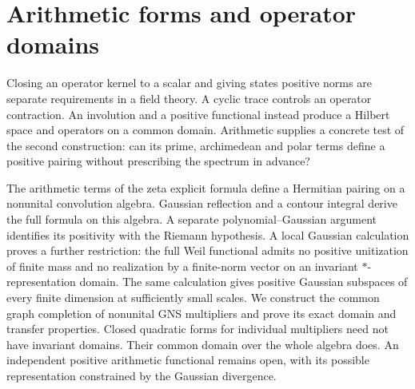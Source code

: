 \chapter{Arithmetic forms and operator domains}
\label{chap:weil-operator-domains}
\begingroup
{}
\newcommand{\A}{\mathcal A}

Closing an operator kernel to a scalar and giving states positive norms
are separate requirements in a field theory.
A cyclic trace controls an operator contraction.  An involution and a
positive functional instead produce a Hilbert space and operators on a
common domain.  Arithmetic supplies a concrete test of the second
construction: can its prime, archimedean and polar terms define a positive
pairing without prescribing the spectrum in advance?

The arithmetic terms of the zeta explicit formula define a Hermitian
pairing on a nonunital convolution algebra.  Gaussian reflection and a
contour integral derive the full formula on this algebra.  A separate
polynomial--Gaussian argument identifies its positivity with the Riemann
hypothesis.  A local Gaussian calculation proves a further
restriction: the full Weil functional admits no positive unitization of
finite mass and no realization by a finite-norm vector on an invariant
$*$-representation domain.  The same calculation gives positive Gaussian
subspaces of every finite dimension at sufficiently small scales.
We construct the common graph completion of
nonunital GNS multipliers and prove its exact domain and transfer
properties.  Closed quadratic forms for individual multipliers need not
have invariant domains.  Their common domain over the whole algebra does.
An independent positive arithmetic functional remains open, with its
possible representation constrained by the Gaussian divergence.


